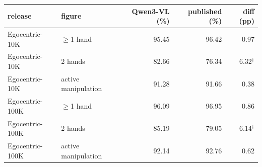 \begin{tabular}{llrrr}
\toprule
release & figure & Qwen3-VL (\%) & published (\%) & diff (pp) \\
\midrule
Egocentric-10K & $\geq$1 hand & 95.45 & 96.42 & 0.97 \\
Egocentric-10K & 2 hands & 82.66 & 76.34 & 6.32$^{\dagger}$ \\
Egocentric-10K & active manipulation & 91.28 & 91.66 & 0.38 \\
Egocentric-100K & $\geq$1 hand & 96.09 & 96.95 & 0.86 \\
Egocentric-100K & 2 hands & 85.19 & 79.05 & 6.14$^{\dagger}$ \\
Egocentric-100K & active manipulation & 92.14 & 92.76 & 0.62 \\
\bottomrule
\end{tabular}
